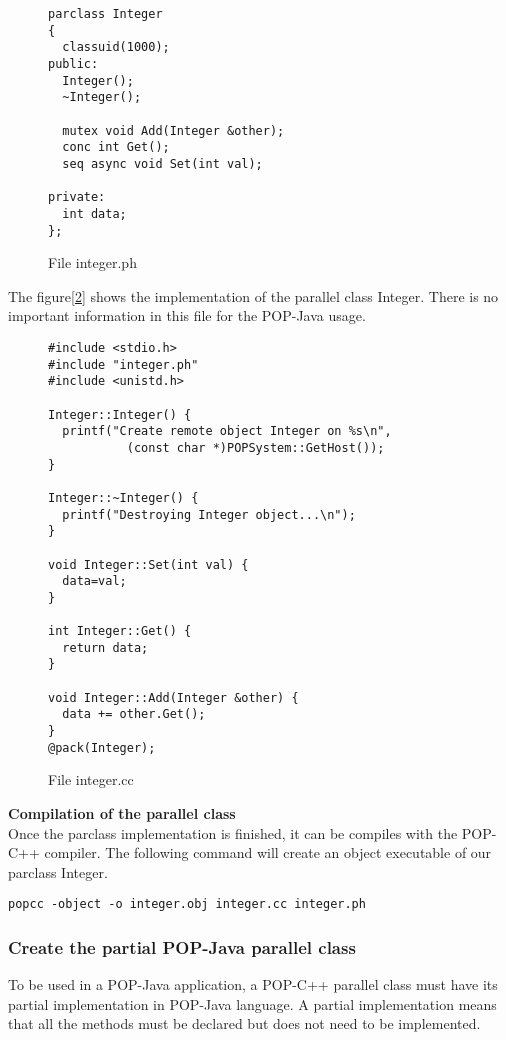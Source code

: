 \begin{figure}[ht]
	\caption{File integer.ph}
	\label{fig:file_integer.ph}
\begin{lstlisting}
parclass Integer
{
  classuid(1000);
public:	
  Integer();
  ~Integer();

  mutex void Add(Integer &other);
  conc int Get();
  seq async void Set(int val);

private:
  int data;
};
\end{lstlisting}
\end{figure}

\pagebreak
The figure[\ref{fig:file_integer.cc}] shows the implementation of the parallel class Integer. There is no important information in this file for the POP-Java usage.

\begin{figure}[ht]
	\caption{File integer.cc}
	\label{fig:file_integer.cc}
\begin{lstlisting}
#include <stdio.h>
#include "integer.ph"
#include <unistd.h>

Integer::Integer() {
  printf("Create remote object Integer on %s\n",
		   (const char *)POPSystem::GetHost());
}

Integer::~Integer() {
  printf("Destroying Integer object...\n");
}

void Integer::Set(int val) {
  data=val;
}

int Integer::Get() {
  return data;
}

void Integer::Add(Integer &other) {
  data += other.Get();
}
@pack(Integer);
\end{lstlisting}
\end{figure}


\textbf{Compilation of the parallel class}\\
Once the parclass implementation is finished, it can be compiles with the POP-C++ compiler. The following command will create an object executable of our parclass Integer.
\begin{lstlisting}
popcc -object -o integer.obj integer.cc integer.ph
\end{lstlisting}


\pagebreak
\subsubsection{Create the partial POP-Java parallel class}
To be used in a POP-Java application, a POP-C++ parallel class must have its partial implementation in POP-Java language. A partial implementation means that all the methods must be declared but does not need to be implemented. \s

